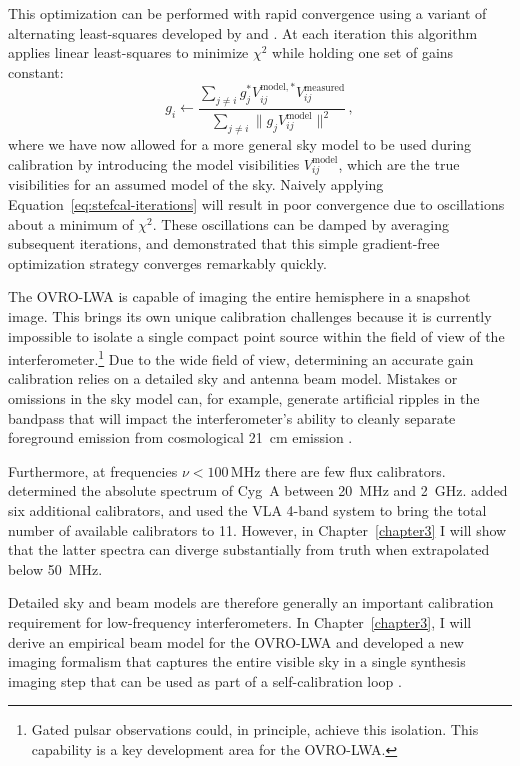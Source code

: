 \begin{bibunit}
This optimization can be performed with rapid convergence using a variant of alternating
least-squares developed by \citet{2008ISTSP...2..707M} and \citet{2014A&A...571A..97S}. At each
iteration this algorithm applies linear least-squares to minimize $\chi^2$ while holding one set of
gains constant:
\begin{equation}\label{eq:stefcal-iterations}
    g_i \leftarrow \frac
        {\sum_{j\neq i} g_j^* V_{ij}^{\text{model},*} V_{ij}^\text{measured}}
        {\sum_{j\neq i} \| g_j V_{ij}^\text{model} \|^2}\,,
\end{equation}
where we have now allowed for a more general sky model to be used during calibration by introducing
the model visibilities $V_{ij}^\text{model}$, which are the true visibilities for an assumed model
of the sky.  Naively applying Equation~\ref{eq:stefcal-iterations} will result in poor convergence
due to oscillations about a minimum of $\chi^2$.  These oscillations can be damped by averaging
subsequent iterations, and \citet{2014A&A...571A..97S} demonstrated that this simple gradient-free
optimization strategy converges remarkably quickly.

The OVRO-LWA is capable of imaging the entire hemisphere in a snapshot image. This brings its own
unique calibration challenges because it is currently impossible to isolate a single compact point source
within the field of view of the interferometer.\footnote{
    Gated pulsar observations could, in principle, achieve this isolation. This capability is a key
    development area for the OVRO-LWA.
}
Due to the wide field of view, determining an accurate gain calibration relies on a detailed sky and
antenna beam model. Mistakes or omissions in the sky model can, for example, generate artificial
ripples in the bandpass that will impact the interferometer's ability to cleanly separate foreground
emission from cosmological 21~cm emission \citep{2016MNRAS.461.3135B, 2017MNRAS.470.1849E}.

Furthermore, at frequencies $\nu < 100\,\text{MHz}$ there are few flux calibrators.
\citet{1977A&A....61...99B} determined the absolute spectrum of Cyg~A between 20~MHz and 2~GHz.
\citet{2012MNRAS.423L..30S} added six additional calibrators, and \citet{2017ApJS..230....7P} used
the VLA 4-band system to bring the total number of available calibrators to 11. However, in
Chapter~\ref{chapter3} I will show that the latter spectra can diverge substantially from truth
when extrapolated below 50~MHz.

Detailed sky and beam models are therefore generally an important calibration requirement for
low-frequency interferometers.  In Chapter~\ref{chapter3}, I will derive an empirical beam model for
the OVRO-LWA and developed a new imaging formalism that captures the entire visible sky in a single
synthesis imaging step that can be used as part of a self-calibration loop
\citep{1978ApJ...223...25R}.


\end{bibunit}
